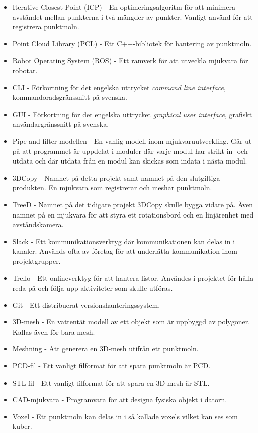 \begin{itemize}
	\item Iterative Closest Point (ICP) - En optimeringsalgoritm för att minimera avståndet mellan punkterna i två mängder av punkter. Vanligt använd för att registrera punktmoln.
	\item Point Cloud Library (PCL) - Ett C++-bibliotek för hantering av punktmoln.
	\item Robot Operating System (ROS) - Ett ramverk för att utveckla mjukvara för robotar.
	\item CLI - Förkortning för det engelska uttrycket \textit{command line interface}, kommandoradsgränssnitt på svenska.
	\item GUI - Förkortning för det engelska uttrycket \textit{graphical user interface}, grafiskt användargränssnitt på svenska.
	\item Pipe and filter-modellen - En vanlig modell inom mjukvaruutveckling. Går ut på att programmet är uppdelat i moduler där varje modul har strikt in- och utdata och där utdata från en modul kan skickas som indata i nästa modul.
	\item 3DCopy - Namnet på detta projekt samt namnet på den slutgiltiga produkten. En mjukvara som registrerar och meshar punktmoln.
	\item TreeD - Namnet på det tidigare projekt 3DCopy skulle bygga vidare på. Även namnet på en mjukvara för att styra ett rotationsbord och en linjärenhet med avståndskamera.
	\item Slack - Ett kommunikationsverktyg där kommunikationen kan delas in i kanaler. Används ofta av företag för att underlätta kommunikation inom projektgrupper.
	\item Trello - Ett onlineverktyg för att hantera listor. Användes i projektet för hålla reda på och följa upp aktiviteter som skulle utföras.
	\item Git - Ett distribuerat versionshanteringssystem.
	\item 3D-mesh - En vattentät modell av ett objekt som är uppbyggd av polygoner. Kallas även för bara mesh.
	\item Meshning - Att generera en 3D-mesh utifrån ett punktmoln.
	\item PCD-fil - Ett vanligt filformat för att spara punktmoln är PCD.
	\item STL-fil - Ett vanligt filformat för att spara en 3D-mesh är STL.
	\item CAD-mjukvara - Programvara för att designa fysiska objekt i datorn.
	\item Voxel - Ett punktmoln kan delas in i så kallade voxels vilket kan ses som kuber.

\end{itemize}
